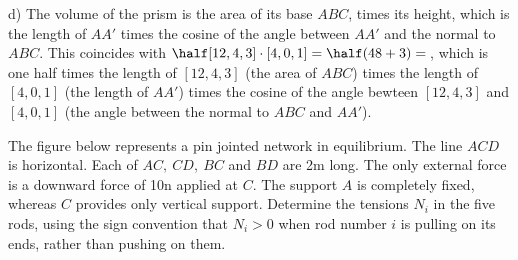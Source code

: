 {\item{}d) The volume of the prism is the area of its base $ABC$,
 times its height, which is the length of $AA'$ times the cosine of the
angle between $AA'$ and the normal to $ABC$. This coincides with
$\half [12,4,3]\cdot[4,0,1]=\half(48+3)=$$\,$, which is one half times the length of
$[12,4,3]$ (the area of $ABC$) times the length of $[4,0,1]$ (the
length of $AA'$) times the cosine of the angle bewteen $[12,4,3]$ and
$[4,0,1]$ (the angle between the normal to $ABC$ and $AA'$).
\medskip
\item{\next}The figure below represents a pin jointed network in equilibrium.
 The line
$ACD$ is horizontal. Each of $AC,\ CD,\ BC$ and $BD$ are 2m long. The only
external force is a downward force of 10n applied at $C$. The support
$A$ is completely fixed, whereas $C$ provides only vertical support.
Determine the tensions $N_i$ in the five rods, using the sign convention
that $N_i>0$ when rod number $i$ is pulling on its ends, rather than pushing on them.


}
